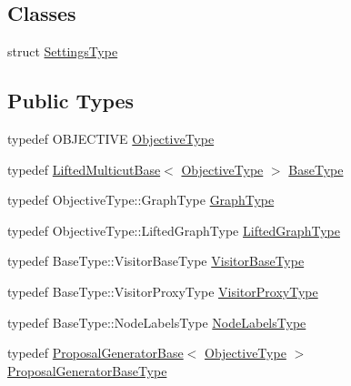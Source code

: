 \subsection*{Classes}
\begin{DoxyCompactItemize}
\item 
struct \hyperlink{structnifty_1_1graph_1_1opt_1_1lifted__multicut_1_1FusionMoveBased_1_1SettingsType}{Settings\+Type}
\end{DoxyCompactItemize}
\subsection*{Public Types}
\begin{DoxyCompactItemize}
\item 
typedef O\+B\+J\+E\+C\+T\+I\+VE \hyperlink{classnifty_1_1graph_1_1opt_1_1lifted__multicut_1_1FusionMoveBased_a9cb2fb9caff3dac87f0d43cf757e676c}{Objective\+Type}
\item 
typedef \hyperlink{classnifty_1_1graph_1_1opt_1_1lifted__multicut_1_1LiftedMulticutBase}{Lifted\+Multicut\+Base}$<$ \hyperlink{classnifty_1_1graph_1_1opt_1_1lifted__multicut_1_1FusionMoveBased_a9cb2fb9caff3dac87f0d43cf757e676c}{Objective\+Type} $>$ \hyperlink{classnifty_1_1graph_1_1opt_1_1lifted__multicut_1_1FusionMoveBased_a2295af0bf362a9101ca4195489ca5624}{Base\+Type}
\item 
typedef Objective\+Type\+::\+Graph\+Type \hyperlink{classnifty_1_1graph_1_1opt_1_1lifted__multicut_1_1FusionMoveBased_a0107ee8ff8d001c593cebc578635af4b}{Graph\+Type}
\item 
typedef Objective\+Type\+::\+Lifted\+Graph\+Type \hyperlink{classnifty_1_1graph_1_1opt_1_1lifted__multicut_1_1FusionMoveBased_ad2390a142658bc110b0f8682201076b4}{Lifted\+Graph\+Type}
\item 
typedef Base\+Type\+::\+Visitor\+Base\+Type \hyperlink{classnifty_1_1graph_1_1opt_1_1lifted__multicut_1_1FusionMoveBased_af4920e3b541fb9b40fb17c4a73f500b5}{Visitor\+Base\+Type}
\item 
typedef Base\+Type\+::\+Visitor\+Proxy\+Type \hyperlink{classnifty_1_1graph_1_1opt_1_1lifted__multicut_1_1FusionMoveBased_a62e5fc5d190c5c7ddd0b3d81fc5f9e96}{Visitor\+Proxy\+Type}
\item 
typedef Base\+Type\+::\+Node\+Labels\+Type \hyperlink{classnifty_1_1graph_1_1opt_1_1lifted__multicut_1_1FusionMoveBased_a927c0df1d813436185e85af1714f1fbe}{Node\+Labels\+Type}
\item 
typedef \hyperlink{classnifty_1_1graph_1_1opt_1_1lifted__multicut_1_1ProposalGeneratorBase}{Proposal\+Generator\+Base}$<$ \hyperlink{classnifty_1_1graph_1_1opt_1_1lifted__multicut_1_1FusionMoveBased_a9cb2fb9caff3dac87f0d43cf757e676c}{Objective\+Type} $>$ \hyperlink{classnifty_1_1graph_1_1opt_1_1lifted__multicut_1_1FusionMoveBased_a7e504d60dbbd2d211557a853dcf97277}{Proposal\+Generator\+Base\+Type}

\end{DoxyCompactItemize}
